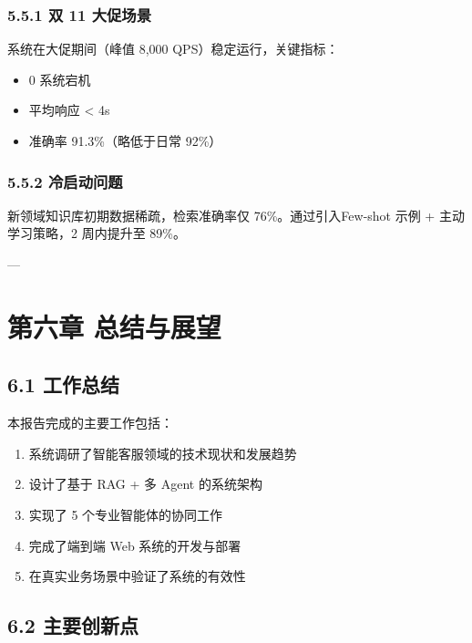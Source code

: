 \documentclass{harryopo-report}
\begin{document}
\subsection*{5.5.1 双 11 大促场景}

系统在大促期间（峰值 8,000 QPS）稳定运行，关键指标：

\begin{itemize}
  \item 0 系统宕机
  \item 平均响应 < 4s
  \item 准确率 91.3\%（略低于日常 92\%）
\end{itemize}

\subsection*{5.5.2 冷启动问题}

新领域知识库初期数据稀疏，检索准确率仅 76\%。通过引入{\fzht Few-shot 示例 + 主动学习}策略，2 周内提升至 89\%。

---

\chapter*{第六章 总结与展望}

\section*{6.1 工作总结}

本报告完成的主要工作包括：

\begin{enumerate}
  \item 系统调研了智能客服领域的技术现状和发展趋势
  \item 设计了基于 RAG + 多 Agent 的系统架构
  \item 实现了 5 个专业智能体的协同工作
  \item 完成了端到端 Web 系统的开发与部署
  \item 在真实业务场景中验证了系统的有效性
\end{enumerate}

\section*{6.2 主要创新点}
\end{document}
